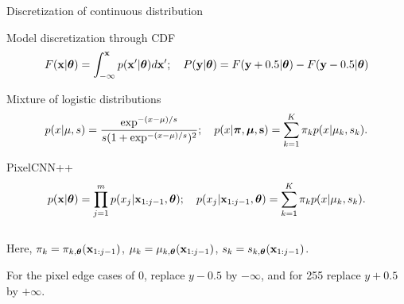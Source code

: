 \documentclass{beamer}
\begin{document}
\begin{frame}{Discretization of continuous distribution}
	\vspace{-0.3cm}
	\begin{block}{Model discretization through CDF}
		\vspace{-0.6cm}
		\[
			F(\mathbf{x} | \boldsymbol{\theta}) = \int_{-\infty}^{\mathbf{x}} p(\mathbf{x}' | \boldsymbol{\theta}) d\mathbf{x}'; \quad 
			P(\mathbf{y} | \boldsymbol{\theta}) = F(\mathbf{y} + 0.5 | \boldsymbol{\theta}) - F(\mathbf{y} - 0.5 | \boldsymbol{\theta})
		\]
	\end{block}
	\vspace{-0.6cm}
	\begin{block}{Mixture of logistic distributions}
		\vspace{-0.7cm}
		\[
			p(x | \mu, s) = \frac{\exp^{-(x - \mu) / s}}{s (1 + \exp^{-(x - \mu) / s})^2}; \quad p(x | \boldsymbol{\pi}, \boldsymbol{\mu}, \mathbf{s}) = \sum_{k=1}^K \pi_k p(x | \mu_k, s_k).
		\]
		\vspace{-0.7cm}
	\end{block}
	\begin{block}{PixelCNN++}
		\vspace{-0.7cm}
		\[
			p(\mathbf{x} | \boldsymbol{\theta}) = \prod_{j=1}^m p(x_j | \mathbf{x}_{1:j-1}, \boldsymbol{\theta}); \quad p(x_j | \mathbf{x}_{1:j-1}, \boldsymbol{\theta}) = \sum_{k=1}^K \pi_k p(x | \mu_k, s_k).
		\]
		\vspace{-0.5cm} \\
		Here, $\pi_k = \pi_{k, \boldsymbol{\theta}}(\mathbf{x}_{1:j-1})$, $\mu_k = \mu_{k, \boldsymbol{\theta}}(\mathbf{x}_{1:j-1})$, $s_k = s_{k, \boldsymbol{\theta}}(\mathbf{x}_{1:j-1})$.
	\end{block}

	For the pixel edge cases of 0, replace $y - 0.5$ by $-\infty$, and for 255 replace $y + 0.5$ by $+\infty$.
	\end{frame}
\end{document}
